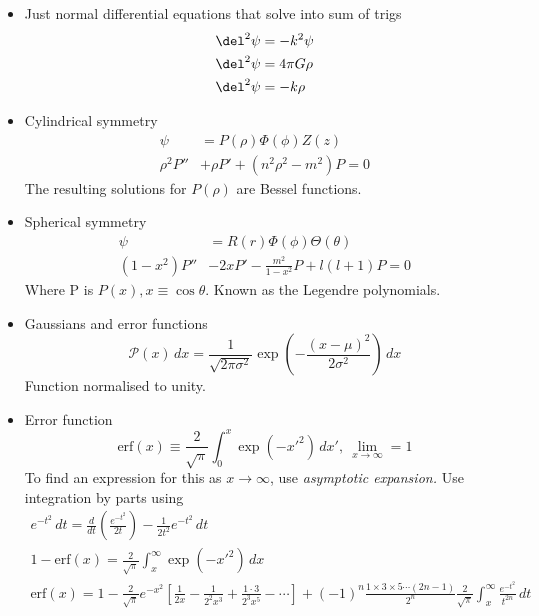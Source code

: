 \documentclass[cplx.tex]{subfiles}
\begin{document}
\begin{itemize}
    \item Just normal differential equations that solve into sum of trigs
        \begin{align}
            \del^2\psi &= -k^2\psi \\
            \del^2\psi &= 4\pi G\rho \\
            \del^2\psi &= -k\rho
        \end{align}
    \item Cylindrical symmetry
        \begin{align}
            \psi &= P(\rho)\Phi(\phi)Z(z) \\
            \rho^2P'' &+ \rho P' + (n^2\rho^2 - m^2)P = 0
        \end{align}
        The resulting solutions for $P(\rho)$ are Bessel functions.
    \item Spherical symmetry
        \begin{align}
            \psi &= R(r)\Phi(\phi)\Theta(\theta) \\
            (1-x^2)P'' &- 2xP' - \frac{m^2}{1-x^2}P + l(l+1)P = 0
        \end{align} 
        Where P is $P(x), x \equiv \cos\theta$.
        Known as the Legendre polynomials.
    \item Gaussians and error functions
        \begin{equation}
            \mathcal{P}(x)\,dx = \frac{1}{\sqrt{2\pi\sigma^2}}\exp\left(-\frac{(x-\mu)^2}{2\sigma^2}\right)\,dx
        \end{equation}
        Function normalised to unity.
    \item Error function
        \begin{equation}
            \text{erf}(x) \equiv \frac{2}{\sqrt{\pi}} \int_0^x \exp(-x'^2)\,dx',~ \lim_{x\to\infty} = 1
        \end{equation}
        To find an expression for this as $x \to \infty$, use \emph{asymptotic expansion.}
        Use integration by parts using 
        \begin{gather}
            e^{-t^2}\,dt = \frac{d}{dt}\left(\frac{e^{-t^2}}{2t}\right) - \frac{1}{2t^2}e^{-t^2}\,dt \\
            1 - \text{erf}(x) = \frac{2}{\sqrt{\pi}}\int_x^\infty \exp(-x'^2)\,dx \\
            \text{erf}(x) = 1 - \frac{2}{\sqrt{\pi}}e^{-x^2}\left[\frac{1}{2x} - \frac{1}{2^2x^3} + \frac{1\cdot3}{2^3x^5} - \cdots\right] + (-1)^n\frac{1\times3\times5\cdots(2n-1)}{2^n}\frac{2}{\sqrt{\pi}} \int_x^\infty \frac{e^{-t^2}}{t^{2n}}\,dt

\end{gather}
\end{itemize}
\end{document}
